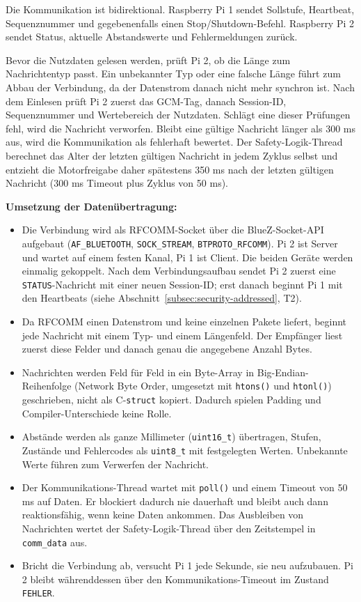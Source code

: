 Die Kommunikation ist bidirektional. Raspberry Pi 1 sendet Sollstufe,
Heartbeat, Sequenznummer und gegebenenfalls einen Stop/Shutdown-Befehl.
Raspberry Pi 2 sendet Status, aktuelle Abstandswerte und Fehlermeldungen zurück.

Bevor die Nutzdaten gelesen werden, prüft Pi 2, ob die Länge zum
Nachrichtentyp passt. Ein unbekannter Typ oder eine falsche Länge führt zum
Abbau der Verbindung, da der Datenstrom danach nicht mehr synchron ist. Nach dem
Einlesen prüft Pi 2 zuerst das GCM-Tag, danach Session-ID, Sequenznummer und
Wertebereich der Nutzdaten. Schlägt eine dieser Prüfungen fehl, wird die
Nachricht verworfen. Bleibt eine gültige Nachricht länger als
300 ms aus, wird die Kommunikation als fehlerhaft bewertet. Der
Safety-Logik-Thread berechnet das Alter der letzten gültigen Nachricht in jedem
Zyklus selbst und entzieht die Motorfreigabe daher spätestens 350 ms nach der
letzten gültigen Nachricht (300 ms Timeout plus Zyklus von 50 ms).

\textbf{Umsetzung der Datenübertragung:}

\begin{itemize}
    \item Die Verbindung wird als RFCOMM-Socket über die BlueZ-Socket-API aufgebaut (\texttt{AF\_BLUETOOTH}, \texttt{SOCK\_STREAM}, \texttt{BTPROTO\_RFCOMM}). Pi 2 ist Server und wartet auf einem festen Kanal, Pi 1 ist Client. Die beiden Geräte werden einmalig gekoppelt. Nach dem Verbindungsaufbau sendet Pi 2 zuerst eine \texttt{STATUS}-Nachricht mit einer neuen Session-ID; erst danach beginnt Pi 1 mit den Heartbeats (siehe Abschnitt~\ref{subsec:security-addressed}, T2).
    \item Da RFCOMM einen Datenstrom und keine einzelnen Pakete liefert, beginnt jede Nachricht mit einem Typ- und einem Längenfeld. Der Empfänger liest zuerst diese Felder und danach genau die angegebene Anzahl Bytes.
    \item Nachrichten werden Feld für Feld in ein Byte-Array in Big-Endian-Reihenfolge (Network Byte Order, umgesetzt mit \texttt{htons()} und \texttt{htonl()}) geschrieben, nicht als C-\texttt{struct} kopiert. Dadurch spielen Padding und Compiler-Unterschiede keine Rolle.
    \item Abstände werden als ganze Millimeter (\texttt{uint16\_t}) übertragen, Stufen, Zustände und Fehlercodes als \texttt{uint8\_t} mit festgelegten Werten. Unbekannte Werte führen zum Verwerfen der Nachricht.
    \item Der Kommunikations-Thread wartet mit \texttt{poll()} und einem Timeout von 50 ms auf Daten. Er blockiert dadurch nie dauerhaft und bleibt auch dann reaktionsfähig, wenn keine Daten ankommen. Das Ausbleiben von Nachrichten wertet der Safety-Logik-Thread über den Zeitstempel in \texttt{comm\_data} aus.
    \item Bricht die Verbindung ab, versucht Pi 1 jede Sekunde, sie neu aufzubauen. Pi 2 bleibt währenddessen über den Kommunikations-Timeout im Zustand \texttt{FEHLER}.
\end{itemize}

